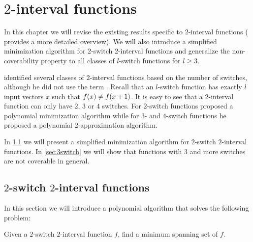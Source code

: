 \chapter{\texorpdfstring{$2$}{2}-interval functions}
\label{chap:2interval}


In this chapter we will revise the existing results specific to
$2$-interval functions
(\citet{Dubovsky2012}
provides a more detailed overview).
We will also introduce a simplified minimization algorithm
for $2$-switch $2$-interval functions
and generalize the non-coverability property to all
classes of $l$-switch functions for $l \geq 3$.

\citeauthor{Dubovsky2012} identified several classes
of $2$-interval functions \citep[p.~5]{Dubovsky2012}
based on the number of switches,
although he did not use the term .
Recall that an $l$-switch function has exactly $l$ input
vectors $x$ such that $f (x) \neq f (x+1)$.
It is easy to see that a $2$-interval function
can only have $2$, $3$ or $4$ switches.
For $2$-switch functions
\citeauthor{Dubovsky2012} proposed
a polynomial minimization algorithm
while for $3$- and $4$-switch functions
he proposed a polynomial $2$-approximation algorithm.


In \cref{sec:2int2switch}
we will present a simplified minimization algorithm
for $2$-switch $2$-interval functions.
In \cref{sec:3switch}
we will show that functions with $3$ and more switches
are not coverable in general.


\section{\texorpdfstring{$2$}{2}-switch
\texorpdfstring{$2$}{2}-interval functions}
\label{sec:2int2switch}

\newcommand{\ftwointtwoswitch}[4]
{#1^{#2}_{\interval{\rep{0}{#2}}{#3},
\interval{#4}{\rep{1}{#2}}}}

\newcommand{\fnba}{\ftwointtwoswitch{f}{n}{b_1}{a_2}}

In this section
we will introduce a polynomial algorithm
that solves the following problem:
\begin{problem}
\label{problem:2switch2intminimization}
Given a $2$-switch
$2$-interval function $f$,
find a minimum spanning set of $f$.
\end{problem}

